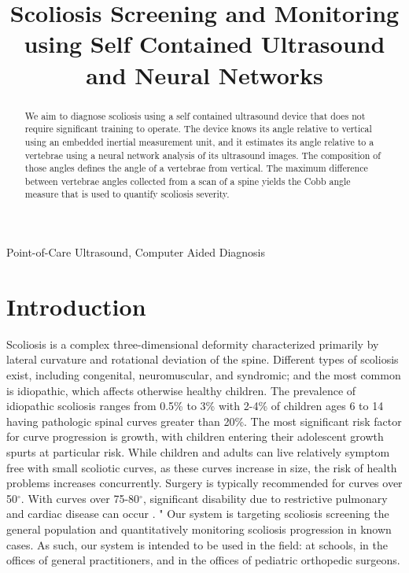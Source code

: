 \documentclass{article}
\title{Scoliosis Screening and Monitoring using Self Contained Ultrasound and Neural Networks}
\begin{document}
%
\maketitle
%
\begin{abstract}
We aim to diagnose scoliosis using a self contained ultrasound device that does not require significant training to operate. The device knows its angle relative to vertical using an embedded inertial measurement unit, and it estimates its angle relative to a vertebrae using a neural network analysis of its ultrasound images.  The composition of those angles defines the angle of a vertebrae from vertical.  The maximum difference between vertebrae angles collected from a scan of a spine yields the Cobb angle measure that is used to quantify scoliosis severity. 
\end{abstract}
%
\begin{keywords}
Point-of-Care Ultrasound, Computer Aided Diagnosis
\end{keywords}
%
\section{Introduction}
\label{sec:intro}

Scoliosis is a complex three-dimensional deformity characterized primarily by lateral curvature and rotational deviation of the spine. Different types of scoliosis exist, including congenital, neuromuscular, and syndromic; and the most common is idiopathic, which affects otherwise healthy children. The prevalence of idiopathic scoliosis ranges from 0.5\% to 3\% \cite{Mor06} with 2-4\% of children ages 6 to 14 having pathologic spinal curves greater than 20\%. The most significant risk factor for curve progression is growth, with children entering their adolescent growth spurts at particular risk. While children and adults can live relatively symptom free with small scoliotic curves, as these curves increase in size, the risk of health problems increases concurrently. Surgery is typically recommended for curves over 50$^\circ$. With curves over 75-80$^\circ$, significant disability due to restrictive pulmonary and cardiac disease can occur \cite{Hae06}.
"
Our system is targeting scoliosis screening the general population and quantitatively monitoring scoliosis progression in known cases. As such, our system is intended to be used in the field: at schools, in the offices of general practitioners, and in the offices of pediatric orthopedic surgeons.
\end{document}
